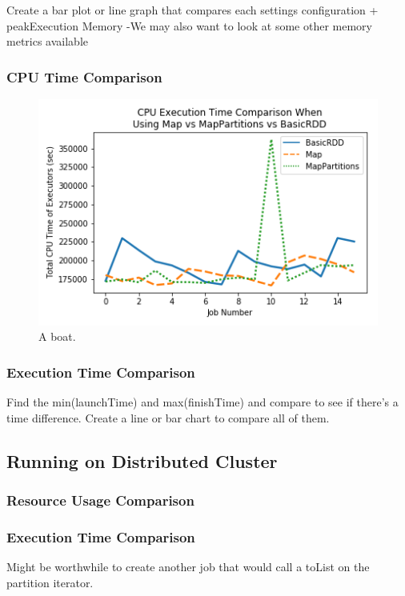 \documentclass[conference]{IEEEtran}
\begin{document}
Create a bar plot or line graph that compares each settings configuration + peakExecution Memory
-We may also want to look at some other memory metrics available

\subsubsection{CPU Time Comparison}
\begin{figure}
    \includegraphics[width=\linewidth]{../python_scripts/images/mapVsMapPartitionsAllCpuTime.png}
    \caption{A boat.}
    \label{fig:boat1}
\end{figure}


\subsubsection{Execution Time Comparison}
Find the min(launchTime) and max(finishTime) and compare to see if there's a time difference.
Create a line or bar chart to compare all of them.

\subsection{Running on Distributed Cluster}
\subsubsection{Resource Usage Comparison}
\subsubsection{Execution Time Comparison}

Might be worthwhile to create another job that would call a toList on the partition iterator.
\end{document}
